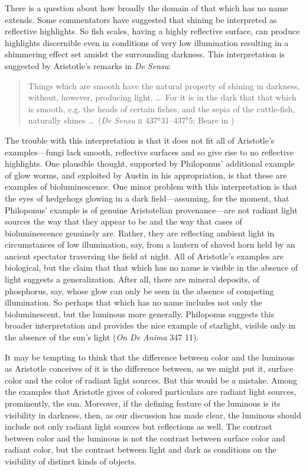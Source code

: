 There is a question about how broadly the domain of that which has no name extends. Some commentators have suggested that shining be interpreted as reflective highlights. So fish scales, having a highly reflective surface, can produce highlights discernible even in conditions of very low illumination resulting in a shimmering effect set amidst the surrounding darkness. This interpretation is suggested by Aristotle's remarks in \emph{De Sensu}: 
\begin{quote}
	Things which are smooth have the natural property of shining in darkness, without, however, producing light. \ldots\ For it is in the dark that that which is smooth, e.g. the heads of certain fishes, and the sepia of the cuttle-fish, naturally shines \ldots\ (\emph{De Sensu} \textsc{ii} 437\( ^{a} \)31--437\( ^{b} \)5; Beare in \citealt[4]{Barnes:1984uq})
\end{quote}
The trouble with this interpretation is that it does not fit all of Aristotle's examples---fungi lack smooth, reflective surfaces and so give rise to no reflective highlights. One plausible thought, supported by Philoponus' additional example of glow worms, and exploited by Austin in his appropriation, is that these are examples of bioluminescence. One minor problem with this interpretation is that the eyes of hedgehogs glowing in a dark field---assuming, for the moment, that Philoponus' example is of genuine Aristotelian provenance---are not radiant light sources the way that they appear to be and the way that cases of  bioluminescence genuinely are. Rather, they are reflecting ambient light in circumstances of low illumination, say, from a lantern of shaved horn held by an ancient spectator traversing the field at night. All of Aristotle's examples are biological, but the claim that that which has no name is visible in the absence of light suggests a generalization. After all, there are mineral deposits, of phosphorus, say, whose glow can only be seen in the absence of competing illumination. So perhaps that which has no name includes not only the bioluminescent, but the luminous more generally. Philoponus suggests this broader interpretation and provides the nice example of starlight, visible only in the absence of the sun's light (\emph{On \emph{De Anima}} 347 11). 

It may be tempting to think that the difference between color and the luminous as Aristotle conceives of it is the difference between, as we might put it, surface color and the color of radiant light sources. But this would be a mistake. Among the examples that Aristotle gives of colored particulars are radiant light sources, prominently, the sun. Moreover, if the defining feature of the luminous is its visibility in darkness, then, as our discussion has made clear, the luminous should include not only radiant light sources but reflections as well. The contrast between color and the luminous is not the contrast between surface color and radiant color, but the contrast between light and dark as conditions on the visibility of distinct kinds of objects.

